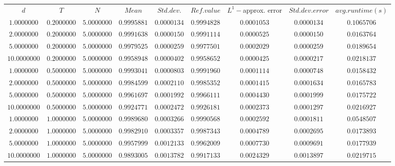 \begin{tabular}{ccccccccc}
$d$ & $T$ & $N$ & $Mean$ & $Std. dev.$ & $Ref. value$ & $L^1-$approx. error & $Std. dev. error$ & $avg. runtime (s)$\\
$1.0000000$ & $0.2000000$ & $5.0000000$ & $0.9995881$ & $0.0000134$ & $0.9994828$ & $0.0001053$ & $0.0000134$ & $0.1065706$\\
$2.0000000$ & $0.2000000$ & $5.0000000$ & $0.9991638$ & $0.0000150$ & $0.9991114$ & $0.0000525$ & $0.0000150$ & $0.0163764$\\
$5.0000000$ & $0.2000000$ & $5.0000000$ & $0.9979525$ & $0.0000259$ & $0.9977501$ & $0.0002029$ & $0.0000259$ & $0.0189654$\\
$10.0000000$ & $0.2000000$ & $5.0000000$ & $0.9958948$ & $0.0000402$ & $0.9958652$ & $0.0000425$ & $0.0000217$ & $0.0218137$\\
$1.0000000$ & $0.5000000$ & $5.0000000$ & $0.9993041$ & $0.0000803$ & $0.9991960$ & $0.0001114$ & $0.0000748$ & $0.0158432$\\
$2.0000000$ & $0.5000000$ & $5.0000000$ & $0.9984599$ & $0.0002110$ & $0.9985352$ & $0.0001415$ & $0.0001634$ & $0.0165783$\\
$5.0000000$ & $0.5000000$ & $5.0000000$ & $0.9961697$ & $0.0001992$ & $0.9966111$ & $0.0004430$ & $0.0001999$ & $0.0175722$\\
$10.0000000$ & $0.5000000$ & $5.0000000$ & $0.9924771$ & $0.0002472$ & $0.9926181$ & $0.0002373$ & $0.0001297$ & $0.0216927$\\
$1.0000000$ & $1.0000000$ & $5.0000000$ & $0.9989680$ & $0.0003266$ & $0.9990568$ & $0.0002592$ & $0.0001811$ & $0.0548507$\\
$2.0000000$ & $1.0000000$ & $5.0000000$ & $0.9982910$ & $0.0003357$ & $0.9987343$ & $0.0004789$ & $0.0002695$ & $0.0173893$\\
$5.0000000$ & $1.0000000$ & $5.0000000$ & $0.9957999$ & $0.0012133$ & $0.9962009$ & $0.0007730$ & $0.0009691$ & $0.0177939$\\
$10.0000000$ & $1.0000000$ & $5.0000000$ & $0.9893005$ & $0.0013782$ & $0.9917133$ & $0.0024329$ & $0.0013897$ & $0.0219715$\\
\end{tabular}
